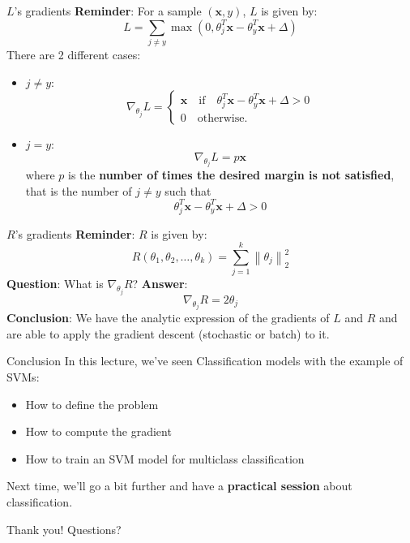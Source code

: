 \documentclass{beamer}
\newcommand{\1}[1]{\mathbbm{1}\left[#1\right]}
\newcommand{\norm}[1]{\left\lVert#1\right\rVert}
\newcommand{\bx}{\bm{x}}
\newcommand{\pv}{\pause\vfill}
\begin{document}
\begin{frame}{$L$'s gradients}
\textbf{Reminder}: For a sample $(\bx, y)$, $L$ is given by:
\begin{equation*}
L = \sum_{j \neq y} \max(0, \theta_j^T\bx - \theta_{y}^T\bx + \Delta)
\end{equation*}
\pv
There are 2 different cases:
\pv
\begin{itemize}
	\item $j \neq y$:
	\begin{equation*}
	\nabla_{\theta_j} L = 
	\begin{cases}
	\bx \quad \text{if} \quad \theta_j^T\bx - \theta_{y}^T\bx + \Delta > 0 \\
	0 \quad \text{otherwise.}
	\end{cases}
	\end{equation*}
\pv
	\item $j = y$:
	\begin{equation*}
	\nabla_{\theta_j} L = p \bx
	\end{equation*}
	where $p$ is the \textbf{number of times the desired margin is not satisfied}, that is the number of $j \neq y$ such that 
	$$\theta_j^T\bx - \theta_{y}^T\bx + \Delta > 0$$
\end{itemize}
\end{frame}

\begin{frame}{$R$'s gradients}
\textbf{Reminder}: $R$ is given by:
\begin{equation*}
R(\theta_1, \theta_2, \dots, \theta_k) = \sum_{j = 1}^k \norm{\theta_j}_2^2
\end{equation*}
\textbf{Question}: What is $\nabla_{\theta_j} R$?
\pv
\textbf{Answer}:
\begin{equation*}
\nabla_{\theta_j} R = 2\theta_j
\end{equation*}
\pv
\textbf{Conclusion}: We have the analytic expression of the gradients of $L$ and $R$ and are able to apply the gradient descent (stochastic or batch) to it.
\end{frame}

\begin{frame}{Conclusion}
In this lecture, we've seen Classification models with the example of SVMs:
\begin{itemize}
	\item How to define the problem
	\item How to compute the gradient
	\item How to train an SVM model for multiclass classification
\end{itemize}
\pv
Next time, we'll go a bit further and have a \textbf{practical session} about classification.
\end{frame}

\begin{frame}
\begin{center}
\Huge{Thank you! Questions?}
\end{center}
\end{frame}
\end{document}

